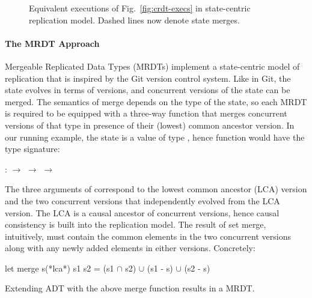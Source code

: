 \begin{figure}[ht]
\begin{subfigure}[t]{0.44\columnwidth}
    \caption{}
    \label{fig:mrdt-exec-2}
  \end{subfigure}
\caption{Equivalent executions of Fig.~\ref{fig:crdt-execs} in
state-centric replication model. Dashed lines now denote state merges.}
\label{fig:mrdt-execs}
\end{figure}

\noindent\paragraph{The MRDT Approach} Mergeable Replicated Data Types
(MRDTs) implement a state-centric model of replication that is
inspired by the Git version control system. Like in Git, the state
evolves in terms of versions, and concurrent versions of the state can
be merged. The semantics of merge depends on the type of the state, so
each MRDT is required to be equipped with a three-way 
function that merges concurrent versions of that type in presence of
their (lowest) common ancestor version. In our running example, the
state is a value of type , hence  function would
have the type signature:
\begin{center}
 :  $\rightarrow$  $\rightarrow$ 
$\rightarrow$ 
\end{center}
The three arguments of  correspond to the lowest common
ancestor (LCA) version and the two concurrent versions that
independently evolved from the LCA version. The LCA is a causal
ancestor of concurrent versions, hence causal consistency is built
into the replication model. The result of set merge, intuitively, must
contain the common elements in the two concurrent versions along with
any newly added elements in either versions. Concretely:
\begin{ocaml}
  let merge s(*lca*) s1 s2 = 
              (s1 $\cap$ s2) $\cup$ (s1 - s) $\cup$ (s2 - s)
\end{ocaml}
Extending  ADT with the above merge function results in a
 MRDT.

